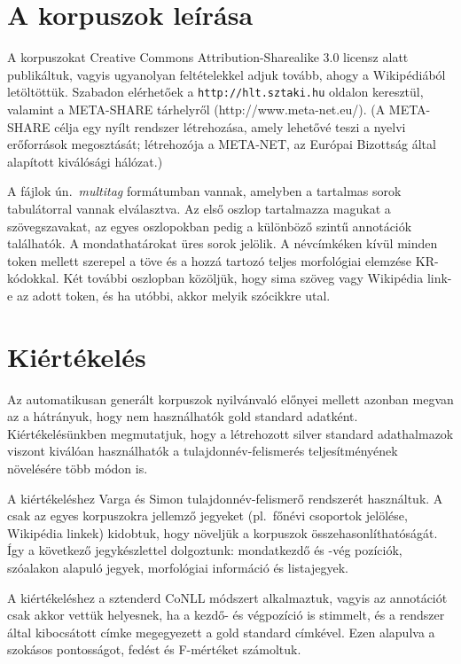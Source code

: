 \documentclass{llncs}
\begin{document}
\section{A korpuszok leírása}
\label{desc}

A korpuszokat Creative Commons Attribution-Sharealike 3.0 licensz alatt publikáltuk, vagyis ugyanolyan feltételekkel adjuk tovább, ahogy a Wikipédiából letöltöttük. Szabadon elérhetőek a \texttt{http://hlt.sztaki.hu} oldalon keresztül, valamint a META-SHARE tárhelyről (http://www.meta-net.eu/). (A META-SHARE célja egy nyílt rendszer létrehozása, amely lehetővé teszi a nyelvi erőforrások megosztását; létrehozója a META-NET, az Európai Bizottság által alapított kiválósági hálózat.) 

A fájlok ún.~\emph{multitag} formátumban vannak, amelyben a tartalmas sorok tabulátorral vannak elválasztva. Az első oszlop tartalmazza magukat a szövegszavakat, az egyes oszlopokban pedig a különböző szintű annotációk találhatók. A mondathatárokat üres sorok jelölik. A névcímkéken kívül minden token mellett szerepel a töve és a hozzá tartozó teljes morfológiai elemzése KR-kódokkal. Két további oszlopban közöljük, hogy sima szöveg vagy Wikipédia link-e az adott token, és ha utóbbi, akkor melyik szócikkre utal. 

\section{Kiértékelés}
\label{results}

Az automatikusan generált korpuszok nyilvánvaló előnyei mellett azonban megvan az a hátrányuk, hogy nem használhatók gold standard adatként. Kiértékelésünkben megmutatjuk, hogy a létrehozott silver standard adathalmazok viszont kiválóan használhatók a tulajdonnév-felismerés teljesítményének növelésére több módon is. 

A kiértékeléshez Varga és Simon \cite{Varga} tulajdonnév-felismerő rendszerét használtuk. A csak az egyes korpuszokra jellemző jegyeket (pl.~főnévi csoportok jelölése, Wikipédia linkek) kidobtuk, hogy növeljük a korpuszok összehasonlíthatóságát. Így a következő jegykészlettel dolgoztunk: mondatkezdő és -vég pozíciók, szóalakon alapuló jegyek, morfológiai információ és listajegyek. 

A kiértékeléshez a sztenderd CoNLL módszert alkalmaztuk, vagyis az annotációt csak akkor vettük helyesnek, ha a kezdő- és végpozíció is stimmelt, és a rendszer által kibocsátott címke megegyezett a gold standard címkével. Ezen alapulva a szokásos pontosságot, fedést és F-mértéket számoltuk. 
\end{document}
